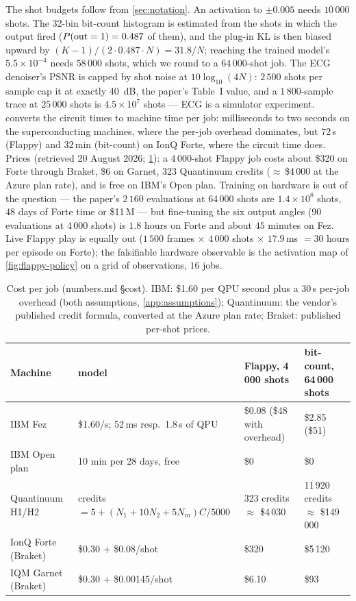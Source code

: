 The shot budgets follow from \cref{sec:notation}.  An activation to $\pm 0.005$ needs
$10\,000$ shots.  The 32-bin bit-count histogram is estimated from the shots in which the
output fired ($P(\mathrm{out}=1) = 0.487$ of them), and the plug-in KL is then biased upward by
$(K-1)/(2\cdot 0.487\cdot N) = 31.8/N$; reaching the trained model's $5.5\times10^{-4}$ needs
$58\,000$ shots, which we round to a $64\,000$-shot job.  The ECG denoiser's PSNR is capped by
shot noise at $10\log_{10}(4N)$: $2\,500$ shots per sample cap it at exactly $40$~dB, the
paper's Table~I value, and a $1\,800$-sample trace at $25\,000$ shots is $4.5\times10^7$ shots
--- ECG is a simulator experiment.   converts the circuit times to machine
time per job: milliseconds to two seconds on the superconducting machines, where the per-job
overhead dominates, but $72$\,s (Flappy) and $32$\,min (bit-count) on IonQ Forte, where the
circuit time does.  Prices (retrieved 20 August 2026; \cref{tab:cost}): a $4\,000$-shot Flappy
job costs about \$320 on Forte through Braket, \$6 on Garnet, $323$ Quantinuum credits
($\approx$\,\$4\,000 at the Azure plan rate), and is free on IBM's Open plan.  Training on
hardware is out of the question --- the paper's $2\,160$ evaluations at $64\,000$ shots are
$1.4\times10^8$ shots, $48$ days of Forte time or \$11\,M --- but fine-tuning the six output
angles ($90$ evaluations at $4\,000$ shots) is $1.8$ hours on Forte and about $45$ minutes on Fez.
Live Flappy play is equally out ($1\,500$ frames $\times$ $4\,000$ shots $\times$ $17.9$\,ms
$=30$ hours per episode on Forte); the falsifiable hardware observable is the activation map of
\cref{fig:flappy-policy} on a grid of observations, $16$ jobs.

\begin{table}[t]
\centering\small
\caption{Cost per job (numbers.md §cost).  IBM: \$1.60 per QPU second plus a 30\,s per-job
overhead (both assumptions, \cref{app:assumptions}); Quantinuum: the vendor's published credit
formula, converted at the Azure plan rate; Braket: published per-shot prices.}
\label{tab:cost}
\begin{tabularx}{\textwidth}{@{}l X l l@{}}
\toprule
Machine & model & Flappy, 4\,000 shots & bit-count, 64\,000 shots \\
\midrule
IBM Fez & \$1.60/s; 52\,ms resp.\ 1.8\,s of QPU & \$0.08 (\$48 with overhead) & \$2.85 (\$51) \\
IBM Open plan & 10 min per 28 days, free & \$0 & \$0 \\
Quantinuum H1/H2 & credits $=5 + (N_1 + 10N_2 + 5N_m)C/5000$ & 323 credits $\approx$ \$4\,030 & 11\,920 credits $\approx$ \$149\,000 \\
IonQ Forte (Braket) & \$0.30 + \$0.08/shot & \$320 & \$5\,120 \\
IQM Garnet (Braket) & \$0.30 + \$0.00145/shot & \$6.10 & \$93 \\
\bottomrule
\end{tabularx}
\end{table}

